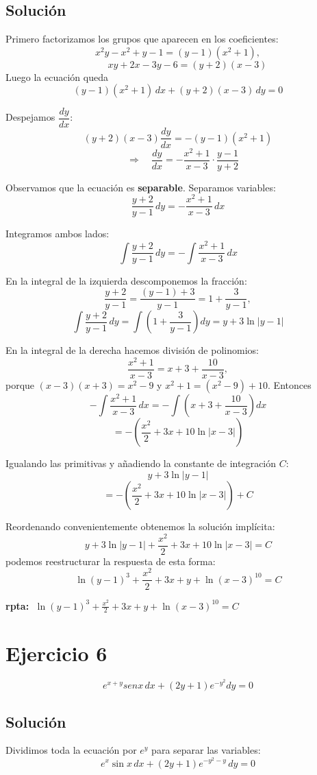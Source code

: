 \documentclass[12pt,a4paper]{article}
\begin{document}
\begin{multicols}{2}
\subsection*{Solución}

Primero factorizamos los grupos que aparecen en los coeficientes:
\[
x^2y-x^2+y-1=(y-1)(x^2+1),
\]
\[
\qquad
xy+2x-3y-6=(y+2)(x-3)
\]
Luego la ecuación queda
\[
(y-1)(x^2+1)\,dx+(y+2)(x-3)\,dy=0
\]

Despejamos \(\dfrac{dy}{dx}\):
\[
(y+2)(x-3)\frac{dy}{dx}=-(y-1)(x^2+1)
\]
\[
\quad\Longrightarrow\quad
\frac{dy}{dx}=-\frac{x^2+1}{x-3}\cdot\frac{y-1}{y+2}
\]

Observamos que la ecuación es \textbf{separable}. Separamos variables:
\[
\frac{y+2}{y-1}\,dy=-\frac{x^2+1}{x-3}\,dx
\]

Integramos ambos lados:
\[
\int\frac{y+2}{y-1}\,dy=-\int\frac{x^2+1}{x-3}\,dx
\]

En la integral de la izquierda descomponemos la fracción:
\[
\frac{y+2}{y-1}=\frac{(y-1)+3}{y-1}=1+\frac{3}{y-1},
\]
\[
\int\frac{y+2}{y-1}\,dy=\int\left(1+\frac{3}{y-1}\right)dy
= y+3\ln|y-1|
\]

En la integral de la derecha hacemos división de polinomios:
\[
\frac{x^2+1}{x-3}=x+3+\frac{10}{x-3},
\]
porque \((x-3)(x+3)=x^2-9\) y \(x^2+1=(x^2-9)+10\). Entonces
\[
-\int\frac{x^2+1}{x-3}\,dx
=-\int\left(x+3+\frac{10}{x-3}\right)dx
\]
\[
=-\left(\frac{x^2}{2}+3x+10\ln|x-3|\right)
\]

Igualando las primitivas y añadiendo la constante de integración \(C\):
\[
y+3\ln|y-1|
\]
\[ = -\left(\frac{x^2}{2}+3x+10\ln|x-3|\right)+C
\]

Reordenando convenientemente obtenemos la solución implícita:
\[
\;y+3\ln|y-1|+\frac{x^2}{2}+3x+10\ln|x-3|=C\
\]
podemos reestructurar la respuesta de esta forma:
\[
\;\ln(y-1)^3+\frac{x^2}{2}+3x+y+\ln(x-3)^{10}=C\
\]

\textbf{rpta: } \(\;\ln(y-1)^3+\frac{x^2}{2}+3x+y+\ln(x-3)^{10}=C\)

\section*{Ejercicio 6}
\[e^{x+y}senx \, dx+(2y+1)e^{-y^2}dy=0\]

\subsection*{Solución}

Dividimos toda la ecuación por \(e^y\) para separar las variables:
\[
e^{x}\sin x\,dx+(2y+1)e^{-y^2-y}\,dy=0
\]


\end{multicols}
\end{document}
